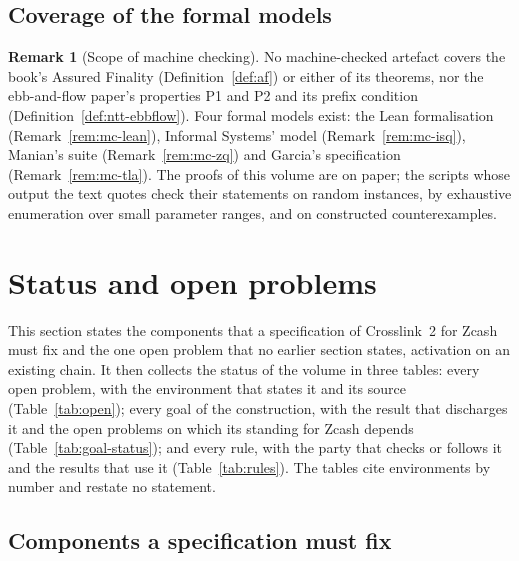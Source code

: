 \documentclass[11pt,a4paper]{article}
\theoremstyle{definition}
\newtheorem{remark}[theorem]{Remark}
\begin{document}
\subsection{Coverage of the formal models}\label{sec:mc-coverage}

\begin{remark}[Scope of machine checking]\label{rem:mc-coverage}
No machine-checked artefact covers the book's Assured Finality
(Definition~\ref{def:af}) or either of its theorems, nor the ebb-and-flow
paper's properties P1 and P2 and its prefix condition
(Definition~\ref{def:ntt-ebbflow}). Four formal models exist: the Lean
formalisation (Remark~\ref{rem:mc-lean}), Informal Systems' model
(Remark~\ref{rem:mc-isq}), Manian's suite (Remark~\ref{rem:mc-zq}) and
Garcia's specification (Remark~\ref{rem:mc-tla}). The
proofs of this volume are on paper; the scripts whose output the text quotes
check their statements on random instances, by exhaustive enumeration over
small parameter ranges, and on constructed counterexamples.
\end{remark}

\section{Status and open problems}\label{sec:open}

This section states the components that a specification of Crosslink~2 for
Zcash must fix and the one open problem that no earlier section states,
activation on an existing chain. It then collects the status of the volume in
three tables: every open problem, with the environment that states it and its
source (Table~\ref{tab:open}); every goal of the construction, with the result
that discharges it and the open problems on which its standing for Zcash
depends (Table~\ref{tab:goal-status}); and every rule, with the party that
checks or follows it and the results that use it (Table~\ref{tab:rules}). The
tables cite environments by number and restate no statement.

\subsection{Components a specification must fix}\label{sec:open-spec}
\end{document}
